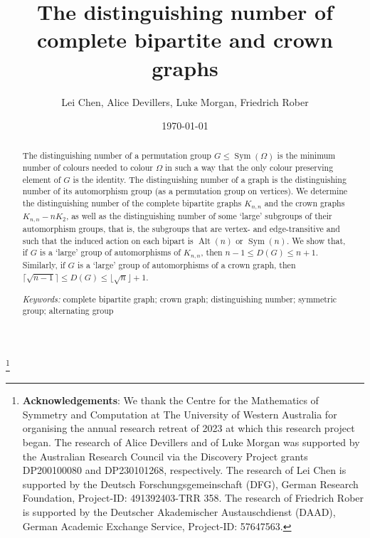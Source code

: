 \documentclass[11pt]{amsart}
\DeclareMathOperator{\Sym}{Sym}
\DeclareMathOperator{\Alt}{Alt}
\begin{document}
\title{The distinguishing number of  complete bipartite and crown graphs}
\author{Lei Chen, Alice Devillers, Luke Morgan, Friedrich Rober}
\address{Lei Chen, Faculty of Mathematics, Bielefeld University, Bielefeld 33615, Germany.}
\address{Alice Devillers and Luke Morgan, The Centre for the Mathematics of Symmetry and Computation, The University of Western Australia, 35 Stirling Highway, Perth WA, 6009.}
\address{Friedrich Rober, Algebra and Representation Theory, RWTH Aachen University, Pontdriesch
10-16, 52062 Aachen, Germany.}

\thanks{\textbf{Acknowledgements}: We thank the Centre for the Mathematics of Symmetry and Computation at The University of
Western Australia for organising the annual research retreat of 2023 at which this research project
began. The research of Alice Devillers and of Luke Morgan was supported by the Australian Research
Council via the Discovery Project grants DP200100080 and DP230101268, respectively. The research of Lei Chen is supported by the Deutsch Forschungsgemeinschaft (DFG), German Research Foundation, Project-ID: 491392403-TRR 358. The research of Friedrich Rober is supported by the Deutscher Akademischer Austauschdienst (DAAD), German Academic Exchange Service, Project-ID: 57647563.
}

\date{\today}





\begin{abstract}
The distinguishing number of a permutation group $G\leqslant\Sym(\Omega)$ is the minimum number of colours needed to colour $\Omega$ in such a way that the only colour preserving element of $G$ is the identity. The distinguishing number of a graph is the distinguishing number of its automorphism group (as a permutation group on vertices).
We determine the distinguishing number of the complete bipartite graphs $K_{n,n}$ and the crown graphs $K_{n,n}-nK_2$, as well as the distinguishing number of some `large' subgroups of their automorphism groups, that is, the subgroups that are vertex- and edge-transitive and such that the induced action on each bipart is $\Alt(n)$ or $\Sym(n)$. 
We show that, if $G$ is a `large' group of automorphisms of $K_{n,n}$,  then $n-1\leqslant D(G) \leqslant n+1$. Similarly, if $G$ is a `large' group of automorphisms of a crown graph, then   $\lceil \sqrt{n-1}\rceil \leqslant D(G)\leqslant \lfloor \sqrt{n}\rfloor+1$.

\smallskip

\textit{Keywords:} complete bipartite graph; crown graph; distinguishing number; symmetric group; alternating group
\end{abstract}
\maketitle
\end{document}
